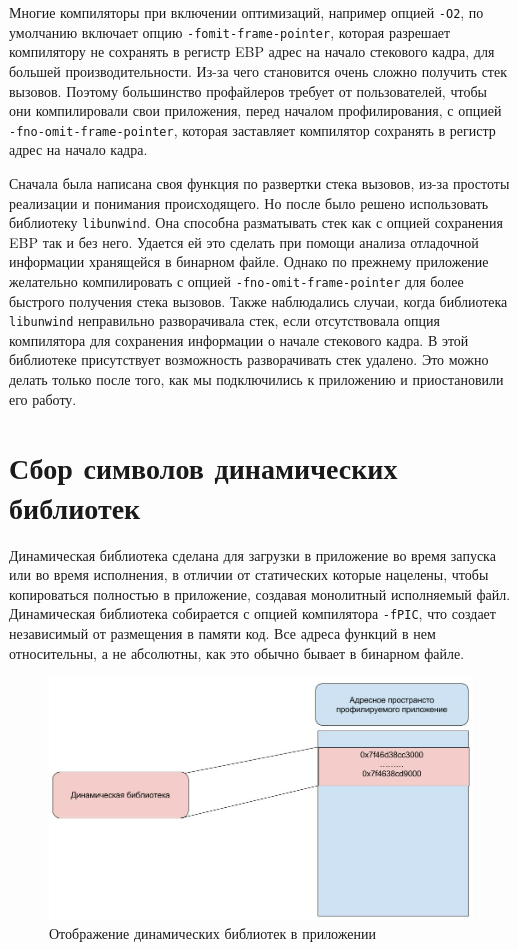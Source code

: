     Многие компиляторы при включении оптимизаций, например опцией \verb|-O2|, по умолчанию включает опцию \verb|-fomit-frame-pointer|, которая разрешает компилятору не сохранять в регистр EBP адрес на начало стекового кадра, для большей производительности. Из-за чего становится очень сложно получить стек вызовов. Поэтому большинство профайлеров требует от пользователей, чтобы они компилировали свои приложения, перед началом профилирования, с опцией \verb|-fno-omit-frame-pointer|, которая заставляет компилятор сохранять в регистр адрес на начало кадра.
    
    Сначала была написана своя функция по развертки стека вызовов, из-за простоты реализации и понимания происходящего. Но после было решено использовать библиотеку \verb|libunwind|. Она способна разматывать стек как с опцией сохранения EBP так и без него. Удается ей это сделать при помощи анализа отладочной информации хранящейся в бинарном файле. Однако по прежнему приложение желательно компилировать с опцией \verb|-fno-omit-frame-pointer| для более быстрого получения стека вызовов. Также наблюдались случаи, когда библиотека \verb|libunwind| неправильно разворачивала стек, если отсутствовала опция компилятора для сохранения информации о начале стекового кадра. В этой библиотеке присутствует возможность разворачивать стек удалено. Это можно делать только после того, как мы подключились к приложению и приостановили его работу.
        
\section{Сбор символов динамических библиотек}
	Динамическая библиотека сделана для загрузки в приложение во время запуска или во время исполнения, в отличии от статических которые нацелены, чтобы копироваться полностью в приложение, создавая монолитный исполняемый файл. Динамическая библиотека собирается с опцией компилятора \verb|-fPIC|, что создает независимый от размещения в памяти код. Все адреса функций в нем относительны, а не абсолютны, как это обычно бывает в бинарном файле. 
    
    \begin{figure}[H]
        \caption{Отображение динамических библиотек в приложении}
        \label{fig:dynamic_lib}
        \centering
        \includegraphics[width=\linewidth]{images/dynamic_lib}
    \end{figure} 
    
